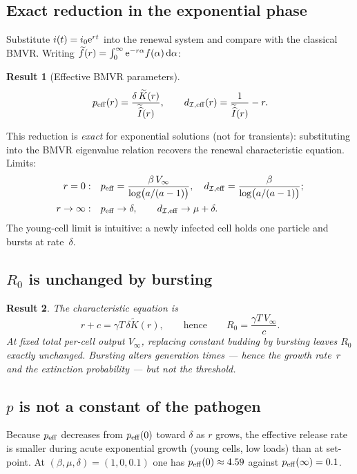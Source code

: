 \documentclass[11pt,a4paper]{article}
\newcommand{\dd}{{\rm d}}
\newcommand{\ee}{{\rm e}}
\newcommand{\Ihat}{\widehat{I}}
\newcommand{\Icell}{\mathcal{I}}
\newcommand{\Lap}[1]{\widetilde{#1}}
\theoremstyle{plain}
\newtheorem{result}{Result}[section]
\theoremstyle{definition}
\theoremstyle{remark}
\begin{document}
\subsection{Exact reduction in the exponential phase}

Substitute $i(t)=i_0\ee^{rt}$ into the renewal system and compare with the
classical BMVR. Writing $\Lap{f}(r)=\int_0^\infty\ee^{-r\alpha}f(\alpha)\,\dd\alpha$:
\begin{result}[Effective BMVR parameters]
\begin{equation}
p_{\rm eff}(r)=\frac{\delta\,\Lap{K}(r)}{\Lap{\Ihat}(r)},
\qquad
d_{\Icell,{\rm eff}}(r)=\frac{1}{\Lap{\Ihat}(r)}-r.
\end{equation}
\end{result}
This reduction is \emph{exact} for exponential solutions (not for transients):
substituting into the BMVR eigenvalue relation recovers the renewal
characteristic equation. Limits:
\begin{align}
r=0:&\quad
p_{\rm eff}=\frac{\beta\,V_\infty}{\log\bigl(a/(a-1)\bigr)},
\quad
d_{\Icell,{\rm eff}}=\frac{\beta}{\log\bigl(a/(a-1)\bigr)};\\
r\to\infty:&\quad
p_{\rm eff}\to\delta,\qquad
d_{\Icell,{\rm eff}}\to\mu+\delta.
\end{align}
The young-cell limit is intuitive: a newly infected cell holds one particle and
bursts at rate~$\delta$.

\subsection{\texorpdfstring{$R_0$}{R0} is unchanged by bursting}

\begin{result}
The characteristic equation is
\[
r+c=\gamma T\,\delta\Lap{K}(r),
\qquad\text{hence}\qquad
R_0=\frac{\gamma T\,V_\infty}{c}.
\]
At fixed total per-cell output $V_\infty$, replacing constant budding by bursting
leaves $R_0$ \emph{exactly} unchanged. Bursting alters generation times ---
hence the growth rate~$r$ and the extinction probability --- but not the
threshold.
\end{result}

\subsection{\texorpdfstring{$p$}{p} is not a constant of the pathogen}

Because $p_{\rm eff}$ decreases from $p_{\rm eff}(0)$ toward $\delta$ as $r$
grows, the effective release rate is smaller during acute exponential growth
(young cells, low loads) than at set-point. At
$(\beta,\mu,\delta)=(1,0,0.1)$ one has $p_{\rm eff}(0)\approx 4.59$ against
$p_{\rm eff}(\infty)=0.1$.
\end{document}
